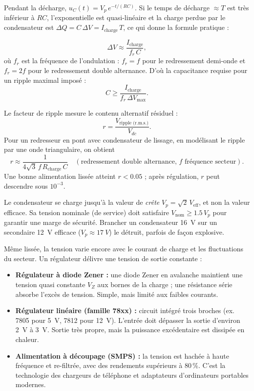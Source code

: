 \documentclass[11pt]{article}
\newcommand{\cle}[1]{{\popxbold\color{popdark}#1}}
\newcounter{popsec}
\newcounter{popsub}
\newcommand{\courssub}[1]{%
  \stepcounter{popsub}%
  \par\vspace{9pt}\noindent{\popxbold\fontsize{11.5}{13}\selectfont\color{popink}{\color{poporange}\thepopsec.\thepopsub}\hspace{6pt}#1}\par\nopagebreak\vspace{4pt}
}
\begin{document}
Pendant la décharge, $u_C(t) = V_p\,e^{-t/(RC)}$. Si le temps de décharge $\approx T$ est très inférieur à $RC$, l'exponentielle est quasi-linéaire et la charge perdue par le condensateur est $\Delta Q = C\,\Delta V = I_{\text{charge}}\,T$, ce qui donne la formule pratique :

\begin{propriete}
\[
\Delta V \approx \frac{I_{\text{charge}}}{f_r\,C},
\]
où $f_r$ est la fréquence de l'ondulation : $f_r = f$ pour le redressement demi-onde et $f_r = 2f$ pour le redressement double alternance. D'où la capacitance requise pour un ripple maximal imposé :
\[
C \geq \frac{I_{\text{charge}}}{f_r\,\Delta V_{\max}}.
\]
\end{propriete}

\begin{methode}
Le \cle{facteur de ripple} mesure le contenu alternatif résiduel :
\[
r = \frac{V_{\text{ripple (r.m.s.)}}}{V_{dc}}.
\]
Pour un redresseur en pont avec condensateur de lissage, en modélisant le ripple par une onde triangulaire, on obtient
\[
r \approx \frac{1}{4\sqrt{3}\,f\,R_{\text{charge}}\,C} \quad (\text{redressement double alternance, } f \text{ fréquence secteur}).
\]
Une bonne alimentation lissée atteint $r < 0.05$ ; après régulation, $r$ peut descendre sous $10^{-3}$.
\end{methode}

\begin{attention}
Le condensateur se charge jusqu'à la valeur de \emph{crête} $V_p = \sqrt{2}\,V_{\text{eff}}$, et non la valeur efficace. Sa tension nominale (de service) doit satisfaire $V_{\text{nom}} \geq 1.5\,V_p$ pour garantir une marge de sécurité. Brancher un condensateur \SI{16}{V} sur un secondaire \SI{12}{V} efficace ($V_p \approx \SI{17}{V}$) le détruit, parfois de façon explosive.
\end{attention}

\courssub{Régulation de tension}

Même lissée, la tension varie encore avec le courant de charge et les fluctuations du secteur. Un \cle{régulateur} délivre une tension de sortie constante :
\begin{itemize}
\item \textbf{Régulateur à diode Zener :} une diode Zener en avalanche maintient une tension quasi constante $V_Z$ aux bornes de la charge ; une résistance série absorbe l'excès de tension. Simple, mais limité aux faibles courants.
\item \textbf{Régulateur linéaire (famille 78xx) :} circuit intégré trois broches (ex. 7805 pour \SI{+5}{V}, 7812 pour \SI{+12}{V}). L'entrée doit dépasser la sortie d'environ \SI{2}{V} à \SI{3}{V}. Sortie très propre, mais la puissance excédentaire est dissipée en chaleur.
\item \textbf{Alimentation à découpage (SMPS) :} la tension est hachée à haute fréquence et re-filtrée, avec des rendements supérieurs à $80\,\%$. C'est la technologie des chargeurs de téléphone et adaptateurs d'ordinateurs portables modernes.
\end{itemize}
\end{document}
